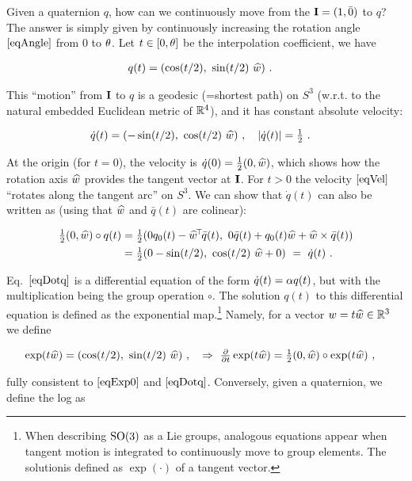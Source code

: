Given a quaternion $q$, how can we continuously move from the ${\rm\bf I}=(1,\bar
0)$ to $q$? The answer is simply given by continuously increasing the
rotation angle $\eqref{eqAngle}$ from $0$ to $\theta$. Let $t\in[0,\theta]$ be
the interpolation coefficient, we have

$$\begin{align}
q(t)
&= (\cos(t/2),~ \sin(t/2)~ \widehat w) ~. \label{eqExp0}
\end{align}$$

This ``motion'' from ${\rm\bf I}$ to $q$ is a geodesic (=shortest path) on
$S^3$ (w.r.t. to the natural embedded Euclidean metric of ${\mathbb{R}}^4$),
and it has constant absolute velocity:

$$\begin{align}\label{eqVel}
\dot q(t)
&= (-\sin(t/2),~ \cos(t/2)~ \widehat w)~,\quad
|\dot q(t)| = \textstyle\frac12 ~.
\end{align}$$

At the origin (for $t=0$), the velocity is
$\dot q(0) = \textstyle\frac12 (0, \widehat w)$, which shows
 how the rotation axis $\widehat w$ provides the tangent vector at
${\rm\bf I}$. For $t>0$ the velocity $\eqref{eqVel}$
``rotates along the tangent arc'' on $S^3$. We can show that $\dot q(t)$
can also be written as (using that $\widehat w$ and $\bar q(t)$ are colinear):

$$\begin{align}
\textstyle\frac12 (0, \widehat w) \circ q(t)
&= \textstyle\frac12 (0 q_0(t) - \widehat w^{\!\top\!} \bar q(t),~ 0 \bar q(t) + q_0(t) \widehat w + \widehat w \times \bar q(t)) \\
&= \textstyle\frac12 (0 - \sin(t/2),~ \cos(t/2)~ \widehat w + 0) ~=~ \dot q(t) ~.  \label{eqDotq}
\end{align}$$

Eq.~$\eqref{eqDotq}$ is a differential equation of the form $\dot q(t)
= \alpha q(t)$, but with the multiplication being the group operation $\circ$. The solution
$q(t)$ to this differential equation is defined as the exponential map.\footnote{When describing $\text{SO}(3)$ as a Lie groups,
analogous equations appear when tangent motion is integrated to
continuously move to group elements. The solutionis defined as
$\exp(\cdot)$ of a tangent vector.} Namely, for a vector $w=t\widehat w \in
{\mathbb{R}}^3$ we define

$$\begin{align}
\exp(t \widehat w)
&= (\cos(t/2),~ \sin(t/2)~ \widehat w) ~,\quad
\Rightarrow~ \textstyle\frac{\partial}{\partial t} \exp(t \widehat w)
 = \textstyle\frac12 (0, \widehat w) \circ \exp(t \widehat w) ~,
\end{align}$$

fully consistent to $\eqref{eqExp0}$ and $\eqref{eqDotq}$. Conversely, given a quaternion, we define the log as


